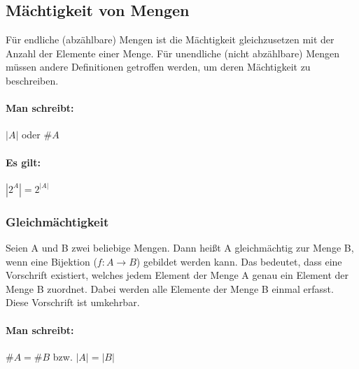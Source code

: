 \subsection{Mächtigkeit von Mengen}
Für endliche (abzählbare) Mengen ist die Mächtigkeit gleichzusetzen mit der Anzahl
der Elemente einer Menge. Für unendliche (nicht abzählbare) Mengen müssen andere
Definitionen getroffen werden, um deren Mächtigkeit zu beschreiben.
\paragraph{Man schreibt:}
\({}|{}A{}|{}\) oder \(\#A\)
\paragraph{Es gilt:}
\begin{math}
{}|{}2^A{}|{} = 2^{{}|{}A{}|{}}
\end{math}
\subsubsection*{Gleichmächtigkeit}
Seien A und B zwei beliebige Mengen.
Dann heißt A gleichmächtig zur Menge B, wenn eine Bijektion (\({f:A}\rightarrow{B}\)) gebildet
werden kann. Das bedeutet, dass eine Vorschrift existiert, welches
jedem Element der Menge A genau ein Element der Menge B zuordnet.
Dabei werden alle Elemente der Menge B einmal erfasst. Diese
Vorschrift ist umkehrbar.
\paragraph{Man schreibt:} \(\#A = \#B\) bzw. \(|A| = |B|\)
